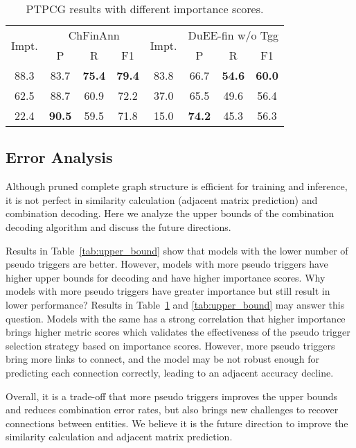 \begin{table}[t]
    \centering
    \small
    \begin{tabular}{cccccccc}
        \toprule
        \multirow{2}{*}{Impt.} & \multicolumn{3}{c}{ChFinAnn} & \multirow{2}{*}{Impt.} & \multicolumn{3}{c}{DuEE-fin w/o Tgg}\\
        \cmidrule(lr){2-4}\cmidrule(lr){6-8}
        & P & R & F1 & & P & R & F1 \\
        \cmidrule(lr){1-4}\cmidrule(lr){5-8}
        88.3 & 83.7 & \textbf{75.4} & \textbf{79.4} & 83.8 & 66.7 & \textbf{54.6} & \textbf{60.0} \\
        62.5 & 88.7 & 60.9 & 72.2 & 37.0 & 65.5 & 49.6 & 56.4 \\
        22.4 & \textbf{90.5} & 59.5 & 71.8 & 15.0 & \textbf{74.2} & 45.3 & 56.3 \\
        \bottomrule
    \end{tabular}
    \caption{PTPCG results with different importance scores.}
    \label{tab:importance_validation}
\end{table}


\subsection{Error Analysis}\label{sec:err_analyze}

Although pruned complete graph structure is efficient for training and inference, it is not perfect in similarity calculation (adjacent matrix prediction) and combination decoding.
Here we analyze the upper bounds of the combination decoding algorithm and discuss the future directions.

Results in Table~\ref{tab:upper_bound} show that models with the lower number of pseudo triggers are better.
However, models with more pseudo triggers have higher upper bounds for decoding and have higher importance scores.
Why models with more pseudo triggers have greater importance but still result in lower performance?
Results in Table~\ref{tab:importance_validation} and \ref{tab:upper_bound} may answer this question.
Models with the same  has a strong correlation that higher importance brings higher metric scores which validates the effectiveness of the pseudo trigger selection strategy based on importance scores.
However, more pseudo triggers bring more links to connect, and the model may be not robust enough for predicting each connection correctly, leading to an adjacent accuracy decline.

Overall, it is a trade-off that more pseudo triggers improves the upper bounds and reduces combination error rates, but also brings new challenges to recover connections between entities.
We believe it is the future direction to improve the similarity calculation and adjacent matrix prediction.

